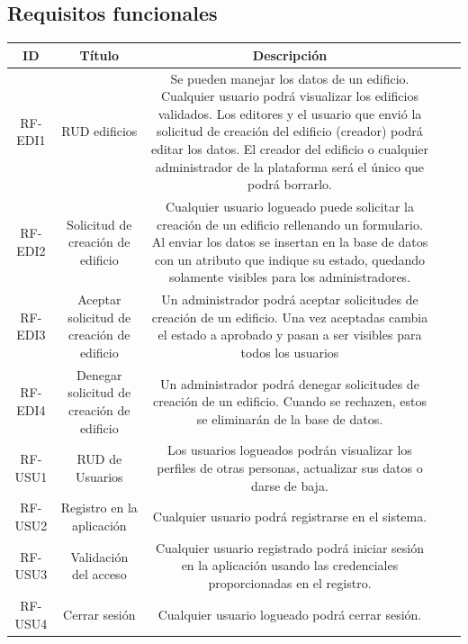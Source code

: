 \documentclass[12pt, a4paper, twoside]{article}
\begin{document}
\subsection{Requisitos funcionales}
\begin{center}
  \begin{tabular}{ |c|c|c|c|c| } 
  \hline
  ID      & Título & Descripción \\ \hline
  RF-EDI1 & RUD edificios & Se pueden manejar los datos de un edificio. 
    Cualquier usuario podrá visualizar los edificios validados. 
    Los editores y el usuario que envió la solicitud de creación del edificio (creador) podrá editar los datos.
    El creador del edificio o cualquier administrador de la plataforma será el único que podrá borrarlo.  \\ \hline
  RF-EDI2 & Solicitud de creación de edificio & Cualquier usuario logueado puede solicitar la creación de un edificio rellenando un formulario. Al enviar los datos se insertan en la base de datos con un atributo que indique su estado, quedando solamente visibles para los administradores. \\ \hline
  RF-EDI3 & Aceptar solicitud de creación de edificio & Un administrador podrá aceptar solicitudes de creación de un edificio. Una vez aceptadas cambia el estado a aprobado y pasan a ser visibles para todos los usuarios \\ \hline
  RF-EDI4 & Denegar solicitud de creación de edificio & Un administrador podrá denegar solicitudes de creación de un edificio. Cuando se rechazen, estos se eliminarán de la base de datos. \\ \hline
  
  RF-USU1 & RUD de Usuarios & Los usuarios logueados podrán visualizar los perfiles de otras personas, actualizar sus datos o darse de baja. \\ \hline
  RF-USU2 & Registro en la aplicación & Cualquier usuario podrá registrarse en el sistema. \\ \hline 
  RF-USU3 & Validación del acceso & Cualquier usuario registrado podrá iniciar sesión en la aplicación usando las credenciales proporcionadas en el registro. \\ \hline
  RF-USU4 & Cerrar sesión & Cualquier usuario logueado podrá cerrar sesión. \\ \hline


\end{tabular}
\end{center}
\end{document}
